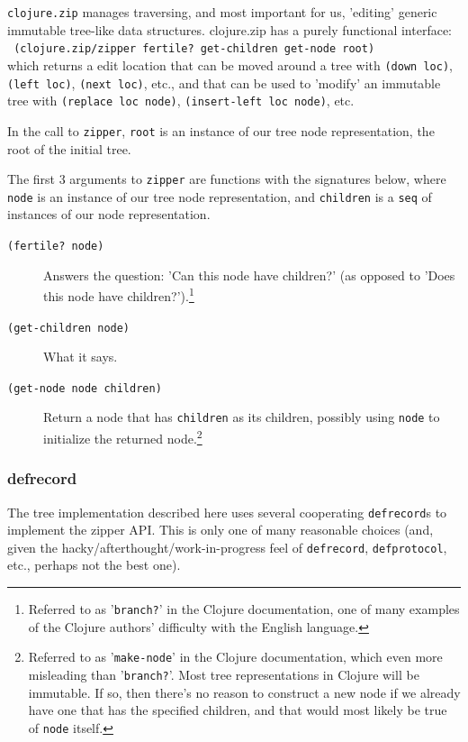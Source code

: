 \documentclass[11pt,openany,american,usenames,dvipsnames,svgnames,x11names,table,isodate]{article}
\numberwithin{equation}{section}
\numberwithin{figure}{section}
\begin{document}
\texttt{clojure.zip} manages traversing, and most important for us,
'editing' generic immutable tree-like data structures. clojure.zip
has a purely functional interface:\\
\texttt{ (clojure.zip/zipper~fertile?~get-children~get-node~root)
}\\
which returns a edit location that can be moved around a tree with
\texttt{(down~loc)}, \texttt{(left~loc)}, \texttt{(next~loc)},
etc., and that can be used to 'modify' an immutable tree with \texttt{(replace~loc~node)},
\texttt{(insert-left~loc~node)}, etc.

In the call to \texttt{zipper}, \texttt{root} is an instance of our
tree node representation, the root of the initial tree.

The first 3 arguments to \texttt{zipper} are functions with the signatures
below, where \texttt{node} is an instance of our tree node representation,
and \texttt{children} is a \texttt{seq} of instances of our node representation. 
\begin{description}
\item [{\texttt{(fertile?~node)}}] Answers the question: 'Can this node
have children?' (as opposed to 'Does this node have
children?').\footnote{Referred to as '\texttt{branch?}' in the Clojure 
documentation, one of many examples of the Clojure authors' difficulty
with the  English language.}
\item [{\texttt{(get-children~node)}}] What it says.
\item [{\texttt{(get-node~node~children)}}] Return a node that has \texttt{children}
as its children, possibly using \texttt{node} to initialize the returned
node.\footnote{Referred to as '\texttt{make-node}' in the Clojure documentation,
which even more misleading than '\texttt{branch?}'. Most tree representations
in Clojure will be immutable. If so, then there's no reason to construct
a new node if we already have one that has the specified children,
and that would most likely be true of \texttt{node} itself.} 
\end{description}

\subsubsection{defrecord}

The tree implementation described here uses several cooperating \texttt{defrecord}s
to implement the zipper API. This is only one of many reasonable choices
(and, given the hacky/afterthought/work-in-progress feel of \texttt{defrecord},
\texttt{defprotocol}, etc., perhaps not the best one).
\end{document}
